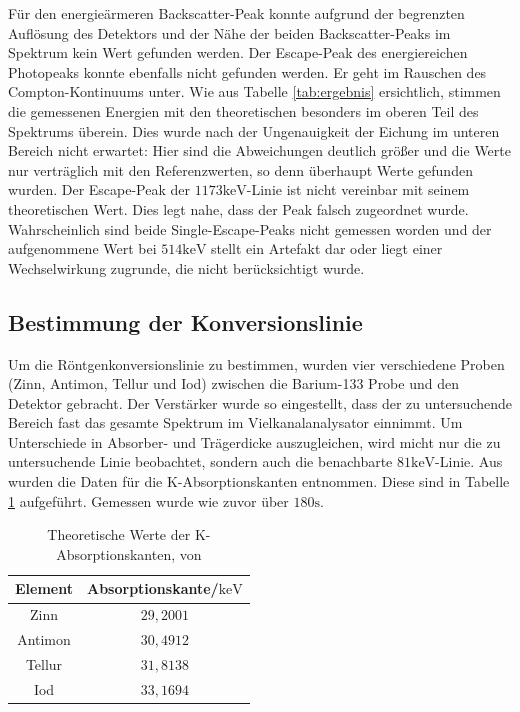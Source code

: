 \documentclass[
	parskip=half,10pt,
	numbers= noenddot, %
	toc=flat, %
	oneside,
	twocolumn,
	]{scrartcl}
\begin{document}
Für den energieärmeren Backscatter-Peak konnte aufgrund der begrenzten Auflösung des Detektors und der Nähe der beiden Backscatter-Peaks im Spektrum kein Wert gefunden 
werden. Der Escape-Peak des energiereichen Photopeaks konnte ebenfalls nicht gefunden werden. Er geht im Rauschen des Compton-Kontinuums unter. 
Wie aus Tabelle \ref{tab:ergebnis} ersichtlich, stimmen die gemessenen Energien mit den theoretischen besonders im oberen Teil des Spektrums überein. Dies wurde 
nach der Ungenauigkeit der Eichung im unteren Bereich nicht erwartet: Hier sind die Abweichungen deutlich größer und die Werte nur verträglich mit den Referenzwerten, 
so denn überhaupt Werte gefunden wurden. Der Escape-Peak der $1173 \si{\kilo \electronvolt}$-Linie ist nicht vereinbar mit seinem theoretischen Wert. Dies legt nahe, 
dass der Peak falsch zugeordnet wurde. Wahrscheinlich sind beide Single-Escape-Peaks nicht gemessen worden und der aufgenommene Wert bei 
$514 \si{\kilo \electronvolt}$ stellt ein Artefakt dar oder liegt einer Wechselwirkung zugrunde, die nicht berücksichtigt wurde. 

\subsection{Bestimmung der Konversionslinie}

Um die Röntgenkonversionslinie zu bestimmen, wurden vier verschiedene Proben (Zinn, Antimon, Tellur und Iod) zwischen die Barium-133 Probe und den Detektor gebracht. 
Der Verstärker wurde so eingestellt, dass der zu untersuchende Bereich fast das gesamte Spektrum im Vielkanalanalysator einnimmt. Um Unterschiede in Absorber- und 
Trägerdicke auszugleichen, wird micht nur die zu untersuchende Linie beobachtet, sondern auch die benachbarte $81 \si{\kilo \electronvolt}$-Linie. 
Aus \cite{washington} wurden die Daten für die K-Absorptionskanten entnommen. Diese sind in Tabelle \ref{tab:kanten_theo} aufgeführt. Gemessen wurde wie zuvor über 
$180 \si{\second}$.

\begin{table}
\centering
\begin{tabular}{cc}
Element & Absorptionskante/$\si{\kilo \electronvolt}$ \\
\hline 
Zinn & $29,2001$ \\
Antimon & $30,4912$\\
Tellur & $31,8138$ \\
Iod & $33,1694$
\end{tabular}
\caption{Theoretische Werte der K-Absorptionskanten, von \citep{washington}}
\label{tab:kanten_theo}
\end{table}
\end{document}
